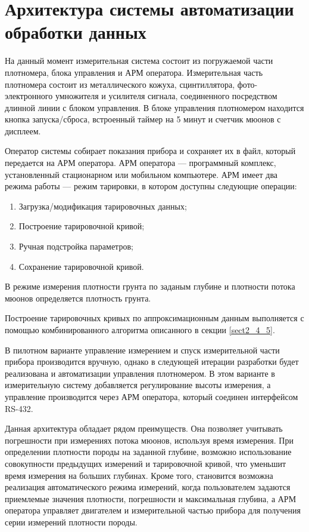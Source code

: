 \section[Архитектура системы автоматизации обработки данных]{Архитектура системы автоматизации \\ обработки данных}\label{subsect2_5}

На данный момент измерительная система состоит из погружаемой части плотномера, блока управления и АРМ оператора. Измерительная часть плотномера состоит из металлического кожуха, сцинтиллятора, фото-электронного умножителя и усилителя сигнала, соединенного посредством длинной линии с блоком управления. В блоке управления плотномером находится кнопка запуска/сброса, встроенный таймер на 5 минут и счетчик мюонов с дисплеем.

Оператор системы собирает показания прибора и сохраняет их в файл, который передается на АРМ оператора. АРМ оператора --- программный комплекс, установленный стационарном или мобильном компьютере. АРМ имеет два режима работы --- режим тарировки, в котором доступны следующие операции:

\begin{enumerate}
	\item Загрузка/модификация тарировочных данных;
	\item Построение тарировочной кривой;
	\item Ручная подстройка параметров;
	\item Сохранение тарировочной кривой.
\end{enumerate}

В режиме измерения плотности грунта по заданым глубине и плотности потока мюонов определяется плотность грунта.

Построение тарировочных кривых по аппроксимационным данным выполняется с помощью комбинированного алгоритма описанного в секции \ref{sect2_4_5}.

В пилотном варианте управление измерением и спуск измерительной части прибора производится вручную, однако в следующей итерации разработки будет реализована и автоматизации управления плотномером. В этом варианте в измерительную систему добавляется регулирование высоты измерения, а управление производится через АРМ оператора, который соединен интерфейсом RS-432.

Данная архитектура обладает рядом преимуществ. Она позволяет учитывать погрешности при измерениях потока мюонов, используя время измерения. 
При определении плотности породы на заданной глубине, возможно использование совокупности предыдущих измерений и тарировочной кривой, что уменьшит время измерения на больших глубинах.
Кроме того, становится возможна реализация автоматического режима измерений, когда пользователем задаются приемлемые значения плотности, погрешности и максимальная глубина, а АРМ оператора управляет двигателем и измерительной частью прибора для получения серии измерений плотности породы. 

% 



\clearpage

